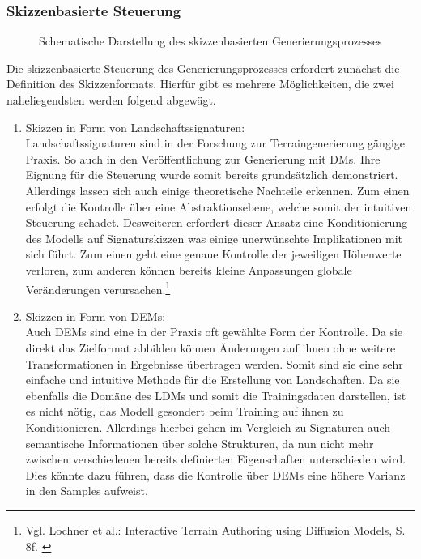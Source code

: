 \subsubsection {Skizzenbasierte Steuerung}

\begin{figure}[htbp]
    \centering
    \caption{Schematische Darstellung des skizzenbasierten Generierungsprozesses}
    \label{fig:guided_method}
\end{figure}
Die skizzenbasierte Steuerung des Generierungsprozesses erfordert zunächst die Definition des Skizzenformats. Hierfür gibt es mehrere Möglichkeiten, die zwei naheliegendsten werden folgend abgewägt. 
\begin{enumerate}
    \item Skizzen in Form von Landschaftssignaturen: \\
    Landschaftssignaturen sind in der Forschung zur Terraingenerierung gängige Praxis. So auch in den Veröffentlichung zur Generierung mit \ac{DM}s. Ihre Eignung für die Steuerung wurde somit bereits grundsätzlich demonstriert. \\
    Allerdings lassen sich auch einige theoretische Nachteile erkennen. Zum einen erfolgt die Kontrolle über eine Abstraktionsebene, welche somit der intuitiven Steuerung schadet. Desweiteren erfordert dieser Ansatz eine Konditionierung des Modells auf Signaturskizzen was einige unerwünschte Implikationen mit sich führt. Zum einen geht eine genaue Kontrolle der jeweiligen Höhenwerte verloren, zum anderen können bereits kleine Anpassungen globale Veränderungen verursachen.\footnote{
        Vgl. Lochner et al.: Interactive Terrain Authoring using Diffusion Models, S. 8f. 
        \cite{lochner2023interactive}
    }
    \item Skizzen in Form von \ac{DEM}s: \\
    Auch \ac{DEM}s sind eine in der Praxis oft gewählte Form der Kontrolle. Da sie direkt das Zielformat abbilden können Änderungen auf ihnen ohne weitere Transformationen in Ergebnisse übertragen werden. Somit sind sie eine sehr einfache und intuitive Methode für die Erstellung von Landschaften. Da sie ebenfalls die Domäne des \ac{LDM}s und somit die Trainingsdaten darstellen, ist es nicht nötig, das Modell gesondert beim Training auf ihnen zu Konditionieren. Allerdings hierbei gehen im Vergleich zu Signaturen auch semantische Informationen über solche Strukturen, da nun nicht mehr zwischen verschiedenen bereits definierten Eigenschaften unterschieden wird. Dies könnte dazu führen, dass die Kontrolle über \ac{DEM}s eine höhere Varianz in den Samples aufweist.
\end{enumerate}

